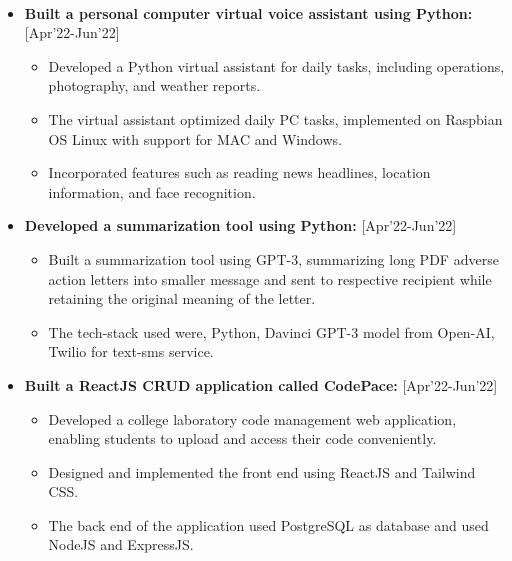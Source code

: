 \documentclass[10pt,article]{article}
\newcommand{\resheading}[1]{{\small \colorbox{mygrey} { \begin{minipage}{0.99\textwidth}\centering{\textbf{#1 \vphantom{p\^{E}}}}\end{minipage}}}}
\begin{document}
\noindent
\resheading{\textbf{PROJECTS} }\\[-0.5cm]
\begin{itemize}

\setlength\itemsep{-0.5em}

\item \textbf{Built a personal computer virtual voice assistant using Python:}\hfill {[Apr'22-Jun’22]} 
\begin{itemize}[noitemsep,nolistsep]
    \item Developed a Python virtual assistant for daily tasks, including operations, photography, and weather reports.
 \item The virtual assistant optimized daily PC tasks, implemented on Raspbian OS Linux with support for MAC and Windows.
 \item Incorporated features such as reading news headlines, location information, and face recognition.
 \end{itemize}
 
\item \textbf{Developed a summarization tool using Python: }\hfill {[Apr'22-Jun’22]} 
\begin{itemize}[noitemsep,nolistsep]
    \item Built a summarization tool using GPT-3, summarizing long PDF adverse action letters into smaller message and sent to respective recipient while retaining the original meaning of the letter.
 \item The tech-stack used were, Python, Davinci GPT-3 model from Open-AI, Twilio for text-sms service.
 \end{itemize}

 \item \textbf{Built a ReactJS CRUD application called CodePace: }\hfill {[Apr'22-Jun’22]} 
\begin{itemize}[noitemsep,nolistsep]
    \item Developed a college laboratory code management web application, enabling students to upload and access their code conveniently.
 \item Designed and implemented the front end using ReactJS and Tailwind CSS.
 \item The back end of the application used PostgreSQL as database and used NodeJS and ExpressJS.
 \end{itemize}

\end{itemize}
\end{document}
